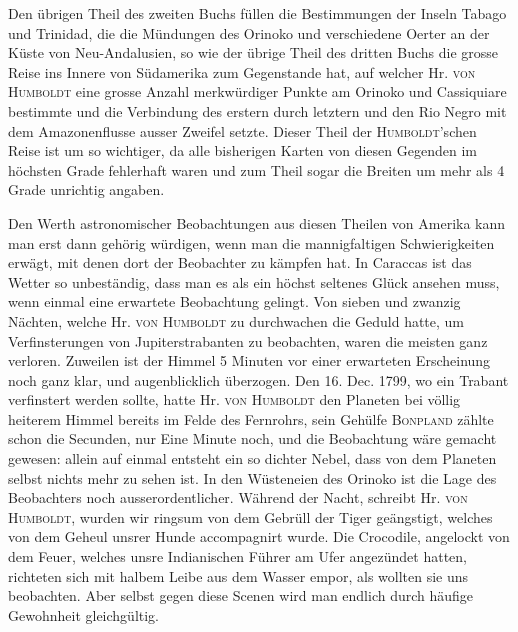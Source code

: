\noindent Den übrigen Theil des zweiten Buchs füllen die Bestimmungen der Inseln Tabago und Trinidad, die die Mündungen des Orinoko und verschiedene Oerter an der Küste von Neu-Andalusien, so wie der übrige Theil des dritten Buchs die grosse Reise ins Innere von Südamerika zum Gegenstande hat, auf welcher Hr. \textsc{von Humboldt} eine grosse Anzahl merkwürdiger Punkte am Orinoko und Cassiquiare bestimmte und die Verbindung des erstern durch letztern und den Rio Negro mit dem Amazonenflusse ausser Zweifel setzte. Dieser Theil der \textsc{Humboldt}'schen Reise ist um so wichtiger, da alle bisherigen Karten von diesen Gegenden im höchsten Grade fehlerhaft waren und zum Theil sogar die Breiten um mehr als 4 Grade unrichtig angaben.

Den Werth astronomischer Beobachtungen aus diesen Theilen von Amerika kann man erst dann gehörig würdigen, wenn man die mannigfaltigen Schwierigkeiten erwägt, mit denen dort der Beobachter zu kämpfen hat. In Caraccas ist das Wetter so unbeständig, dass man es als ein höchst seltenes Glück ansehen muss, wenn einmal eine erwartete Beobachtung gelingt. Von sieben und zwanzig Nächten, welche Hr. \textsc{von Humboldt} zu durchwachen die Geduld hatte, um Verfinsterungen von Jupiterstrabanten zu beobachten, waren die meisten ganz verloren. Zuweilen ist der Himmel 5 Minuten vor einer erwarteten Erscheinung noch ganz klar, und augenblicklich überzogen. Den 16. Dec. 1799, wo ein Trabant verfinstert werden sollte, hatte Hr. \textsc{von Humboldt} den Planeten bei völlig heiterem Himmel bereits im Felde des Fernrohrs, sein Gehülfe \textsc{Bonpland} zählte schon die Secunden, nur Eine Minute noch, und die Beobachtung wäre gemacht gewesen: allein auf einmal entsteht ein so dichter Nebel, dass von dem Planeten selbst nichts mehr zu sehen ist. In den Wüsteneien des Orinoko ist die Lage des Beobachters noch ausserordentlicher. Während der Nacht, schreibt Hr. \textsc{von Humboldt}, wurden wir ringsum von dem Gebrüll der Tiger geängstigt, welches von dem Geheul unsrer Hunde accompagnirt wurde. Die Crocodile, angelockt von dem Feuer, welches unsre Indianischen Führer am Ufer angezündet hatten, richteten sich mit halbem Leibe aus dem Wasser empor, als wollten sie uns beobachten. Aber selbst gegen diese Scenen wird man endlich durch häufige Gewohnheit gleichgültig.

